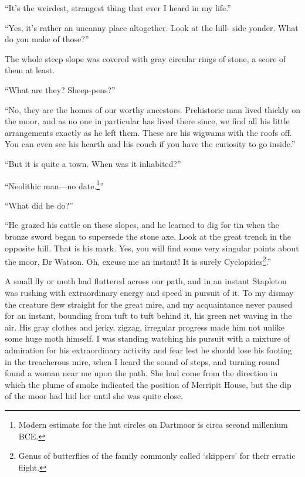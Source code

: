 \documentclass[paper=a5,BCOR=7mm,twoside,DIV=calc,12pt,usegeometry,openany,chapterprefix,endperiod,headings=big]{scrbook} %
\begin{document}
\enquote{It's the weirdest, strangest thing that ever I heard in my life.}

\enquote{Yes, it's rather an uncanny place altogether. Look at the hill- side yonder. What do you make of those?}

The whole steep slope was covered with gray circular rings of stone, a score of them at least.

\enquote{What are they? Sheep-pens?}

\enquote{No, they are the homes of our worthy ancestors. Prehistoric man lived thickly on the moor, and as no one in particular has lived there since, we find all his little arrangements exactly as he left them. These are his wigwams with the roofs off. You can even see his hearth and his couch if you have the curiosity to go inside.}

\enquote{But it is quite a town. When was it inhabited?}

\enquote{Neolithic man---no date.\footnote{Modern estimate for the hut circles on Dartmoor is circa second millenium BCE.}}

\enquote{What did he do?}

\enquote{He grazed his cattle on these slopes, and he learned to dig for tin when the bronze sword began to supersede the stone axe. Look at the great trench in the opposite hill. That is his mark. Yes, you will find some very singular points about the moor, Dr Watson. Oh, excuse me an instant! It is surely Cyclopides\footnote{Genus of butterflies of the family commonly called \enquote{skippers} for their erratic flight.}.}


A small fly or moth had fluttered across our path, and in an instant Stapleton was rushing with extraordinary energy and speed in pursuit of it. To my dismay the creature flew straight for the great mire, and my acquaintance never paused for an instant, \newline bounding from tuft to tuft behind it, his green net waving in the air. His gray clothes and jerky, zigzag, irregular progress made him not unlike some huge moth himself. I was standing watching his pursuit with a mixture of admiration for his extraordinary activity and fear lest he should lose his footing in the treacherous mire, when I heard the sound of steps, and turning round found a woman near me upon the path. She had come from the direction in which the plume of smoke indicated the position of Merripit House, but the dip of the moor had hid her until she was quite close.
\end{document}
